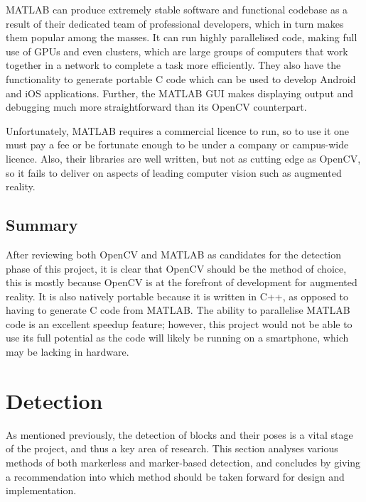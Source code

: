 MATLAB can produce extremely stable software and functional codebase as a result of their dedicated team of professional developers, which in turn makes them popular among the masses. It can run highly parallelised code, making full use of GPUs and even clusters, which are large groups of computers that work together in a network to complete a task more efficiently. They also have the functionality to generate portable C code which can be used to develop Android and iOS applications. Further, the MATLAB GUI makes displaying output and debugging much more straightforward than its OpenCV counterpart.

Unfortunately, MATLAB requires a commercial licence to run, so to use it one must pay a fee or be fortunate enough to be under a company or campus-wide licence. Also, their libraries are well written, but not as cutting edge as OpenCV, so it fails to deliver on aspects of leading computer vision such as augmented reality.

\subsection{Summary}

After reviewing both OpenCV and MATLAB as candidates for the detection phase of this project, it is clear that OpenCV should be the method of choice, this is mostly because OpenCV is at the forefront of development for augmented reality. It is also natively portable because it is written in C++, as opposed to having to generate C code from MATLAB. The ability to parallelise MATLAB code is an excellent speedup feature; however, this project would not be able to use its full potential as the code will likely be running on a smartphone, which may be lacking in hardware.


\section{Detection}

As mentioned previously, the detection of blocks and their poses is a vital stage of the project, and thus a key area of research. This section analyses various methods of both markerless and marker-based detection, and concludes by giving a recommendation into which method should be taken forward for design and implementation.

